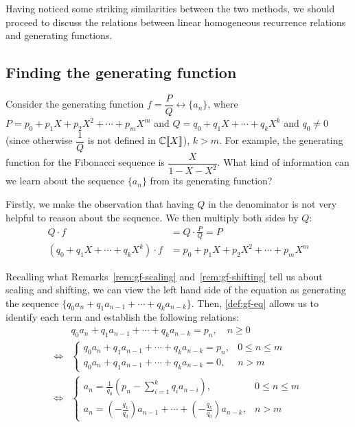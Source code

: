 \documentclass[a4paper, 12pt]{report}
\begin{document}
Having noticed some striking similarities between the two methods, we should proceed to discuss the relations between linear homogeneous recurrence relations and generating functions.

\subsection{Finding the generating function}
Consider the generating function $f = \dfrac{P}{Q} \longleftrightarrow \{a_n\}$, where $P = p_0 + p_1 X + p_2 X^2 + \cdots + p_m X^m$ and $Q = q_0 + q_1 X + \cdots + q_k X^k$ and $q_0 \neq 0$ (since otherwise $\dfrac{1}{Q}$ is not defined in $\mathbb{C} \llbracket X \rrbracket$), $k > m$. For example, the generating function for the Fibonacci sequence is $\dfrac{X}{1 - X - X^2}$. What kind of information can we learn about the sequence $\{a_n\}$ from its generating function?

Firstly, we make the observation that having $Q$ in the denominator is not very helpful to reason about the sequence. We then multiply both sides by $Q$:
\begin{align*}
    Q \cdot f &= Q \cdot \frac{P}{Q} = P\\
    (q_0 + q_1 X + \cdots + q_k X^k) \cdot f &= p_0 + p_1 X + p_2 X^2 + \cdots + p_m X^m
\end{align*}

Recalling what Remarks~\ref{rem:gf-scaling} and~\ref{rem:gf-shifting} tell us about scaling and shifting, we can view the left hand side of the equation as generating the sequence $\{q_0 a_n + q_1 a_{n - 1} + \cdots + q_k a_{n - k}\}$. Then, \cref{def:gf-eq} allows us to identify each term and establish the following relations:
\begin{align*}\label{eq:rec-reational-fxn}
&q_0 a_n + q_1 a_{n - 1} + \cdots + q_k a_{n - k} = p_n, \quad n \geq 0\\
\iff &\begin{cases}
    q_0 a_n + q_1 a_{n - 1} + \cdots + q_k a_{n - k} = p_n, & 0 \leq n \leq m\\
    q_0 a_n + q_1 a_{n - 1} + \cdots + q_k a_{n - k} = 0,   & n > m
\end{cases}\\
\iff &\begin{cases}
    a_n = \frac{1}{q_0} (p_n - \sum_{i = 1}^{k} q_i a_{n - i}), & 0 \leq n \leq m \\
    a_n = (-\frac{q_1}{q_0}) a_{n - 1} + \cdots + (-\frac{q_k}{q_0}) a_{n - k}, & n > m 
\end{cases}\tag{**}
\end{align*}
\end{document}
